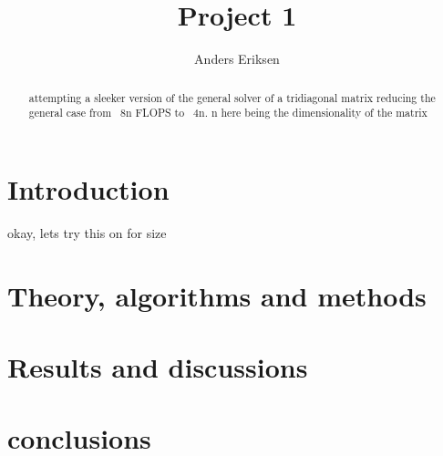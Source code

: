 \documentclass[10pt,showpacs,preprintnumbers,footinbib,amsmath,amssymb,aps,prl,twocolumn,groupedaddress,superscriptaddress,showkeys]{revtex4-1}
\begin{document}
\title{Project 1}
\author{Anders Eriksen}
\begin{abstract}
attempting a sleeker version of the general solver of a tridiagonal matrix reducing the general case from ~8n FLOPS to ~4n. n here being the dimensionality of the matrix
\end{abstract}
\maketitle

\section{Introduction}
okay, lets try this on for size

\section{Theory, algorithms and methods}

\section{Results and discussions}

\section{conclusions}
\end{document}
